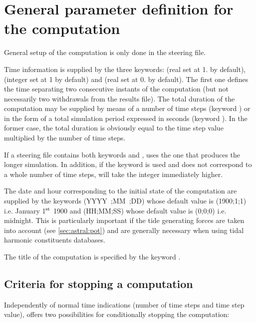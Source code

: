 \chapter{General parameter definition for the computation}
\label{ch:gen:par:def:comp}
General setup of the computation is only done in the steering
file.

Time information is supplied by the three keywords:
 (real set at 1. by default), 
(integer set at 1 by default) and  (real set at 0. by default).
The first one defines the time separating two consecutive instants of the
computation (but not necessarily two withdrawals from the results file).
The total duration of the computation may be supplied by means
of a number of time steps (keyword )
or in the form of a total simulation period expressed in seconds
(keyword ).
In the former case, the total duration is obviously equal to the time step value
multiplied by the number of time steps.

If a steering file contains both keywords 
and ,  uses the one that produces
the longer simulation.
In addition, if the keyword  is used and does not correspond
to a whole number of time steps,  will take the integer immediately
higher.

The date and hour corresponding to the initial state of the computation
are supplied by the keywords  (YYYY~;MM~;DD)
whose default value is (1900;1;1) i.e. January 1$^{\rm{st}}$ 1900
and  (HH;MM;SS)
whose default value is (0;0;0) i.e. midnight.
This is particularly important if the tide generating forces are taken
into account (see \ref{sec:astral:pot}) and are generally necessary
when using tidal harmonic constituents databases.

The title of the computation is specified by the keyword .


\section{Criteria for stopping a computation}

Independently of normal time indications (number of time steps and time step
value),  offers two possibilities for conditionally stopping the
computation:

